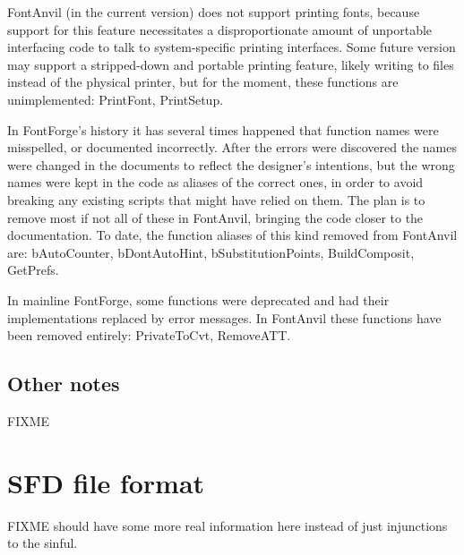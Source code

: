 \documentclass[11pt]{report}
\begin{document}
FontAnvil (in the current version) does not support printing fonts, because
support for this feature necessitates a disproportionate amount of
unportable interfacing code to talk to system-specific printing interfaces. 
Some future version may support a stripped-down and portable printing
feature, likely writing to files instead of the physical printer, but for
the moment, these functions are unimplemented:  PrintFont, PrintSetup.

In FontForge's history it has several times happened that function names
were misspelled, or documented incorrectly.  After the errors were
discovered the names were changed in the documents to reflect the designer's
intentions, but the wrong names were kept in the code as aliases of the
correct ones, in order to avoid breaking any existing scripts that might
have relied on them.  The plan is to remove most if not all of these in
FontAnvil, bringing the code closer to the documentation.  To date, the
function aliases of this kind removed from FontAnvil are: bAutoCounter,
bDontAutoHint, bSubstitutionPoints, BuildComposit, GetPrefs.

In mainline FontForge, some functions were deprecated and had their
implementations replaced by error messages.  In FontAnvil these functions
have been removed entirely:  PrivateToCvt, RemoveATT.

\section{Other notes}

FIXME

\clearpage

\iffalse
\chapter{SFD file format}

FIXME should have some more real information here instead of just
injunctions to the sinful.
\end{document}
